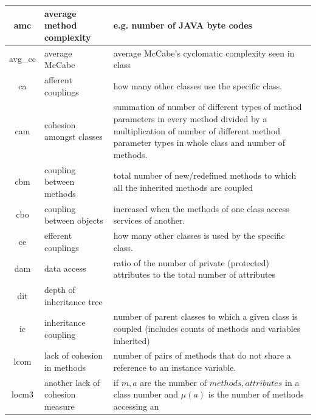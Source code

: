 \documentclass[smallextended]{svjour3}
\begin{document}


\begin{table}[t]
\renewcommand{\baselinestretch}{0.8}\begin{center}
{\scriptsize
\begin{tabular}{c|l|p{}}
amc & average method complexity & e.g. number of JAVA byte codes\\\hline
avg\_cc & average McCabe & average McCabe's cyclomatic complexity seen
in class\\\hline
ca & afferent couplings & how many other classes use the specific
class. \\\hline
cam & cohesion amongst classes & summation of number of different
types of method parameters in every method divided by a multiplication
of number of different method parameter types in whole class and
number of methods. \\\hline
cbm &coupling between methods &  total number of new/redefined methods
to which all the inherited methods are coupled\\\hline
cbo & coupling between objects & increased when the methods of one
class access services of another.\\\hline
ce & efferent couplings & how many other classes is used by the
specific class. \\\hline
dam & data access & ratio of the number of private (protected)
attributes to the total number of attributes\\\hline
dit & depth of inheritance tree &\\\hline
ic & inheritance coupling &  number of parent classes to which a given
class is coupled (includes counts of methods and variables inherited)
\\\hline
lcom & lack of cohesion in methods &number of pairs of methods that do
not share a reference to an instance variable.\\\hline
locm3 & another lack of cohesion measure & if $m,a$ are  the number of
$methods,attributes$
in a class number and $\mu(a)$  is the number of methods accessing an

\end{tabular}}
\end{center}
\end{table}
\end{document}
